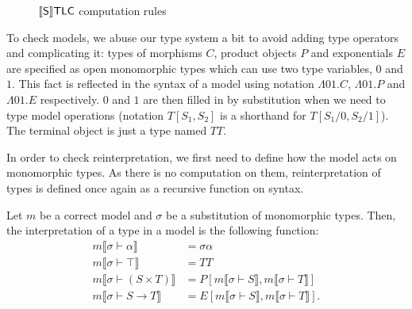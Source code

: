\begin{figure}
\centering
{}
\caption{$\llbracket\mathsf{S}\rrbracket\mathsf{TLC}$ computation rules}
\label{sstlc-comp}
\end{figure}

To check models, we abuse our type system a bit 
to avoid adding type operators and complicating it:
types of morphisms $C$, product objects $P$ and
exponentials $E$ are specified as open monomorphic types
which can use two type variables, $0$ and $1$. This fact
is reflected in the syntax of a model using notation
$\Lambda 01.C$, $\Lambda 01.P$ and $\Lambda 01.E$
respectively. $0$ and $1$ are then filled in by
substitution when we need to type model operations
(notation $T[S_1, S_2]$ is a shorthand for
$T[S_1/0, S_2/1]$). The terminal object is
just a type named $TT$.

In order to check reinterpretation, we first need to
define how the model acts on monomorphic types. As there
is no computation on them, reinterpretation of types is
defined once again as a recursive function on syntax.

\begin{definition}
    Let $m$ be a correct model and $\sigma$ be a
    substitution of monomorphic types. Then, the
    interpretation of a type in a model is the following
    function:
    \begin{align}{}
        m\llbracket\sigma\vdash\alpha\rrbracket&=
            \sigma\alpha \\
        m\llbracket\sigma\vdash\top\rrbracket&=TT \\
        m\llbracket\sigma\vdash(S\times T)\rrbracket&=
            P[m\llbracket\sigma\vdash S\rrbracket,
            m\llbracket\sigma\vdash T\rrbracket] \\
        m\llbracket\sigma\vdash S\to T\rrbracket&=
            E[m\llbracket\sigma\vdash S\rrbracket,
            m\llbracket\sigma\vdash T\rrbracket].
    \end{align}
\end{definition}

